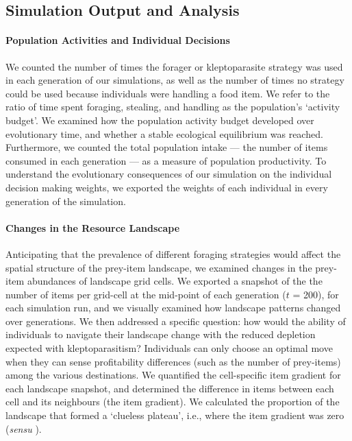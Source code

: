 \documentclass[11pt]{article}
\begin{document}
\subsection{Simulation Output and Analysis}

\paragraph{Population Activities and Individual Decisions}

We counted the number of times the forager or kleptoparasite strategy was used in each generation of our simulations, as well as the number of times no strategy could be used because individuals were handling a food item.
We refer to the ratio of time spent foraging, stealing, and handling as the population's `activity budget'.
We examined how the population activity budget developed over evolutionary time, and whether a stable ecological equilibrium was reached.
Furthermore, we counted the total population intake --- the number of items consumed in each generation --- as a measure of population productivity.
%
To understand the evolutionary consequences of our simulation on the individual decision making weights, we exported the weights of each individual in every generation of the simulation.

\paragraph{Changes in the Resource Landscape}

Anticipating that the prevalence of different foraging strategies would affect the spatial structure of the prey-item landscape, we examined changes in the prey-item abundances of landscape grid cells.
We exported a snapshot of the the number of items per grid-cell at the mid-point of each generation ($t$ = 200), for each simulation run, and we visually examined how landscape patterns changed over generations.
We then addressed a specific question: how would the ability of individuals to navigate their landscape change with the reduced depletion expected with kleptoparasitism?
Individuals can only choose an optimal move when they can sense profitability differences (such as the number of prey-items) among the various destinations.
We quantified the cell-specific item gradient for each landscape snapshot, and determined the difference in items between each cell and its neighbours (the item gradient).
We calculated the proportion of the landscape that formed a `clueless plateau', i.e., where the item gradient was zero (\textit{sensu} \citealt{perkins1992a}).
\end{document}
